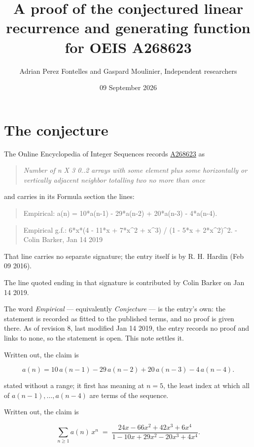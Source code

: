 \documentclass[11pt]{article}
\title{A proof of the conjectured linear recurrence and generating function for OEIS A268623}
\author{Adrian Perez Fontelles and Gaspard Moulinier, Independent researchers}
\date{09 September 2026}
\theoremstyle{definition}
\begin{document}
\maketitle
\section{The conjecture}

The Online Encyclopedia of Integer Sequences records \href{https://oeis.org/A268623}{A268623} as

\begin{quote}\itshape Number of n X 3 0..2 arrays with some element plus some horizontally or vertically adjacent neighbor totalling two no more than once\end{quote}

and carries in its Formula section the lines:

\begin{quote}\ttfamily Empirical: a(n) = 10*a(n-1) - 29*a(n-2) + 20*a(n-3) - 4*a(n-4).\end{quote}

\begin{quote}\ttfamily Empirical g.f.: 6*x*(4 - 11*x + 7*x\textasciicircum{}2 + x\textasciicircum{}3) / (1 - 5*x + 2*x\textasciicircum{}2)\textasciicircum{}2. - Colin Barker, Jan 14 2019\end{quote}

That line carries no separate signature; the entry itself is by R. H. Hardin (Feb 09 2016).

The line quoted ending in that signature is contributed by Colin Barker on Jan 14 2019.

The word {\itshape Empirical} --- equivalently {\itshape Conjecture} --- is the entry's own: the statement is recorded as fitted to the published terms, and no proof is given there. As of revision 8, last modified Jan 14 2019, the entry records no proof and links to none, so the statement is open. This note settles it.

Written out, the claim is

\[a(n) = 10\,a(n-1) - 29\,a(n-2) + 20\,a(n-3) - 4\,a(n-4).\]

stated without a range; it first has meaning at $n = 5$, the least index at which all of $a(n-1),\dots,a(n-4)$ are terms of the sequence.

Written out, the claim is

\[\sum_{n \ge 1} a(n)\,x^n \;=\; \frac{24x - 66x^{2} + 42x^{3} + 6x^{4}}{1 - 10x + 29x^{2} - 20x^{3} + 4x^{4}}.\]
\end{document}
